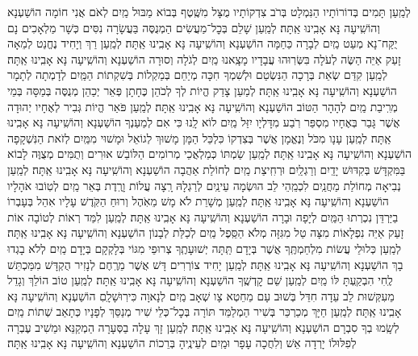 \documentclass[twoside, openany, parskip=half, 11pt]{book}
\begin{document}
\begin{small}
לְמַֽעַן תָּמִים בְּדוֹרוֹתָיו הַנִּמְלָט בְּרֹב צִדְקוֹתָיו
מֻצָּל מִשֶּֽׁטֶף בְּבוֹא מַבּוּל מַֽיִם לְאֹם אֲנִי חוֹמָה הוֹשַׁעְנָא וְהוֹשִֽׁיעָה נָּא אָבִֽינוּ אַֽתָּה׃
לְמַֽעַן שָׁלֵם בְּכׇל־מַעֲשִׂים הַמְנֻסֶּה בַּעֲשָׂרָה נִסִּים
כְּשָׁר מַלְאָכִים נָם יֻקַּח־נָא מְעַט מַֽיִם לְבָרָה כַּחַמָּה הוֹשַׁעְנָא וְהוֹשִֽׁיעָה נָּא אָבִֽינוּ אַֽתָּה׃
לְמַֽעַן רַךְ וְיָחִיד נֶחֱנַט לְמֵאָה זָעַק אַיֵּה הַשֶּׂה לְעֹלָה
בִּשְּׂרֽוּהוּ עֲבָדָיו מָצָֽאנוּ מַֽיִם לְגֹלָה וְסוּרָה הוֹשַׁעְנָא וְהוֹשִֽׁיעָה נָּא אָבִֽינוּ אַֽתָּה׃
לְמַֽעַן קִדַּם שְׂאֵת בְּרָכָה הַנִּשְׂטַם וּלְשִׁמְךָ חִכָּה
מְיַחֵם בְּמַקְלוֹת בְּשִׁקְתוֹת הַמַּֽיִם לְדָמְתָה לְתָמָר הוֹשַׁעְנָא וְהוֹשִֽׁיעָה נָּא אָבִֽינוּ אַֽתָּה׃
לְמַעַן צָדַק הֱיוֹת לְךָ לְכֹהֵן כֶּחָתָן פְּאֵר יְכַהֵן
מְנֻסֶּה בְּמַסָּה בְּמֵי מְרִֽיבַת מַֽיִם לְהָהָר הַטּוֹב הוֹשַׁעְנָא וְהוֹשִֽׁיעָה נָּא אָבִֽינוּ אַֽתָּה׃
לְמַֽעַן פֹּאַר הֱיוֹת גְּבִיר לְאֶחָיו יְהוּדָה אֲשֶׁר גָּבַר בְּאֶחָיו
מִסְפַּר רֹֽבַע מִדָּלְיָו יִזַּל מַֽיִם לוֹא לָֽנוּ כִּי אִם לְמַעַנְךָ הוֹשַׁעְנָא וְהוֹשִֽׁיעָה נָּא אָבִֽינוּ אַֽתָּה׃
לְמַֽעַן עָנָו מִכֹּל וְנֶאֱמָן אֲשֶׁר בְּצִדְקוֹ כִּלְכֵּל הַמָּן
מָשׁוּךְ לְגוֹאֵל וּמָשׁוּי מִמַּֽיִם לְזֹאת הַנִּשְׁקָפָה הוֹשַׁעְנָא וְהוֹשִֽׁיעָה נָּא אָבִֽינוּ אַֽתָּה׃
לְמַֽעַן שַׂמְתּוֹ כְּמַלְאֲכֵי מְרוֹמִים הַלּוֹבֵשׁ אוּרִים וְתֻמִּים
מְצֻוֶּה לָבוֹא בַּמִּקְדָּשׁ בְּקִדּוּשׁ יָדַֽיִם וְרַגְלַֽיִם וּרְחִֽיצַת מַֽיִם
לְחוֹלַת אַהֲבָה הוֹשַׁעְנָא וְהוֹשִֽׁיעָה נָּא אָבִֽינוּ אַֽתָּה׃
לְמַֽעַן נְבִיאָה מְחוֹלַת מַחֲנַֽיִם לִכְמֵֽהֵי לֵב הוּשְׂמָה עֵינַֽיִם
לְרַגְלָהּ רָֽצָה עֲלוֹת וָרֶֽדֶת בְּאֵר מַֽיִם לְטֽוֹבוּ אֹהָלָיו הוֹשַׁעְנָא וְהוֹשִֽׁיעָה נָּא אָבִֽינוּ אַֽתָּה׃
לְמַֽעַן מְשָׁרֵת לֹא מָשׁ מֵאֹֽהֶל וְרוּחַ הַקֹּֽדֶשׁ עָלָיו אִהֵל
בְּעָבְרוֹ בַיַּרְדֵּן נִכְרְתוּ הַמַּֽיִם לְיָפָה וּבָרָה הוֹשַׁעְנָא וְהוֹשִֽׁיעָה נָּא אָבִֽינוּ אַֽתָּה׃
לְמַֽעַן לִמַּד רְאוֹת לְטוֹבָה אוֹת זָעַק אַיֵּה נִפְלָאוֹת
מִצָּה טַל מִגִּזָּה מְלֹא הַסֵּֽפֶל מַֽיִם לְכַלַּת לְבָנוֹן הוֹשַׁעְנָא וְהוֹשִֽׁיעָה נָּא אָבִֽינוּ אַֽתָּה׃
לְמַֽעַן כְּלוּלֵי עֲשׂוֹת מִלְחַמְתֶּֽךָ אֲשֶׁר בְּיָדָם תַּֽתָּה יְשׁוּעָתֶֽךָ
צְרוּפֵי מִגּוֹי בְּלָקְקָם בְּיָדָם מַֽיִם לְלֹא בָגְדוּ בָךְ הוֹשַׁעְנָא וְהוֹשִֽׁיעָה נָּא אָבִֽינוּ אַֽתָּה׃
לְמַֽעַן יָחִיד צוֹרְרִים דָּשׁ אֲשֶׁר מֵרֶֽחֶם לְנָזִיר הֻקְדָּשׁ
מִמַּכְתֵּשׁ לֶֽחִי הִבְקַֽעְתָּ לּוֹ מַֽיִם לְמַֽעַן שֵׁם קׇדְשֶֽׁךָ הוֹשַׁעְנָא וְהוֹשִֽׁיעָה נָּא אָבִֽינוּ אַֽתָּה׃
לְמַֽעַן טוֹב הוֹלֵךְ וְגָדֵל מֵעִקְּשׁוּת לֵב עֵדָה חִדֵּל
בְּשׁוּב עָם מֵחֵטְא צָו שְׁאָב מַֽיִם לְנָאוָה כִּירֽוּשָׁלָֽםִ הוֹשַׁעְנָא וְהוֹשִֽׁיעָה נָּא אָבִֽינוּ אַֽתָּה׃
לְמַֽעַן חַיָּךְ מְכַרְכֵּר בְּשִׁיר הַמְלַמֵּד תּוֹרָה בְּכׇל־כְּלֵי שִׁיר
מְנַסֵּךְ לְפָנָיו כְּתָאַב שְׁתוֹת מַֽיִם לְשָֽׂמוּ בְךָ סִבְרָם הוֹשַׁעְנָא וְהוֹשִֽׁיעָה נָּא אָבִֽינוּ אַֽתָּה׃
לְמַֽעַן זָךְ עָלָה בַסְּעָרָה הַמְקַנֵּא וּמֵשִׁיב עֶבְרָה
לְפִלּוּלוֹ יָרְדָה אֵשׁ וְלִחֲכָה עָפָר וּמַֽיִם לְעֵינֶֽיהָ בְּרֵכוֹת הוֹשַׁעְנָא וְהוֹשִֽׁיעָה נָּא אָבִֽינוּ אַֽתָּה׃

\end{small}
\end{document}
